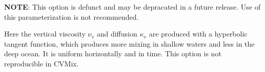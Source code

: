 \textbf{NOTE}: This option is defunct and may be depracated in a future release.  Use of this parameterization is not recommended.

Here the vertical viscosity $\nu_v$ and diffusion $\kappa_v$ are produced with a hyperbolic tangent function, which produces more mixing in shallow waters and less in the deep ocean.  It is uniform horizontally and in time.  This option is not reproducible in CVMix.

